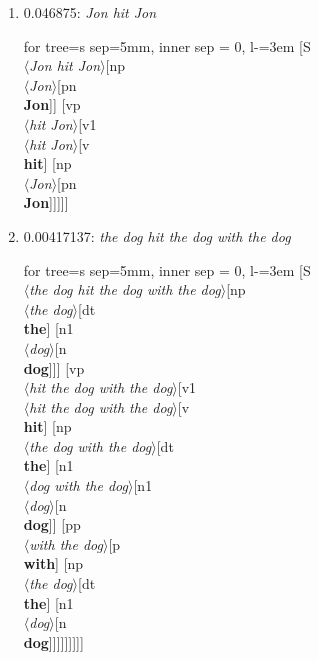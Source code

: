 \documentclass[11pt]{article}
\begin{document}
\begin{enumerate}
	\item  0.046875: \textit{Jon hit Jon} \\[0.5em]
	\begin{adjustbox}{max width = \textwidth}
	\begin{forest}
	for tree={s sep=5mm, inner sep = 0, l-=3em}
	[S\\$\langle$\textit{Jon hit Jon}$\rangle$[np\\$\langle$\textit{Jon}$\rangle$[pn\\\textbf{Jon}]] [vp\\$\langle$\textit{hit Jon}$\rangle$[v1\\$\langle$\textit{hit Jon}$\rangle$[v\\\textbf{hit}] [np\\$\langle$\textit{Jon}$\rangle$[pn\\\textbf{Jon}]]]]]
	\end{forest}
	\end{adjustbox}
	\newpage

	\item  0.00417137: \textit{the dog hit the dog with the dog} \\[0.5em]
	\begin{adjustbox}{max width = \textwidth}
	\begin{forest}
	for tree={s sep=5mm, inner sep = 0, l-=3em}
	[S\\$\langle$\textit{the dog hit the dog with the dog}$\rangle$[np\\$\langle$\textit{the dog}$\rangle$[dt\\\textbf{the}] [n1\\$\langle$\textit{dog}$\rangle$[n\\\textbf{dog}]]] [vp\\$\langle$\textit{hit the dog with the dog}$\rangle$[v1\\$\langle$\textit{hit the dog with the dog}$\rangle$[v\\\textbf{hit}] [np\\$\langle$\textit{the dog with the dog}$\rangle$[dt\\\textbf{the}] [n1\\$\langle$\textit{dog with the dog}$\rangle$[n1\\$\langle$\textit{dog}$\rangle$[n\\\textbf{dog}]] [pp\\$\langle$\textit{with the dog}$\rangle$[p\\\textbf{with}] [np\\$\langle$\textit{the dog}$\rangle$[dt\\\textbf{the}] [n1\\$\langle$\textit{dog}$\rangle$[n\\\textbf{dog}]]]]]]]]]
	\end{forest}
	\end{adjustbox}
	\newpage

\end{enumerate}
\end{document}
